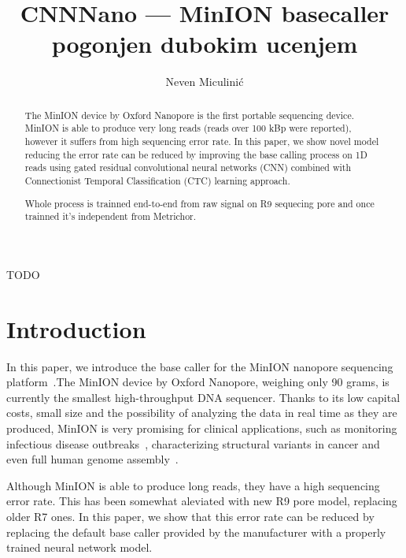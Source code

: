 \documentclass[times, utf8, seminar]{fer}
\begin{document}
\theoremstyle{definition}
\newtheorem{definition}{Definition}[section]

\title{CNNNano --- MinION  basecaller pogonjen dubokim ucenjem}
\author{Neven Miculinić}

\maketitle
\tableofcontents

\begin{sazetak}
TODO


\end{sazetak}

\begin{abstract}
    The MinION device by Oxford Nanopore is the first portable sequencing device. MinION is able to produce very long reads (reads over 100 kBp were reported), however it suffers from high sequencing error rate. In this paper, we show novel model reducing the error rate can be reduced by improving the base calling process on 1D reads using gated residual convolutional neural networks (CNN) combined with Connectionist Temporal Classification (CTC) learning approach.

    Whole process is trainned end-to-end from raw signal on R9 sequecing pore and once trainned it's independent from Metrichor.
\keywords{}
\end{abstract}

\chapter{Introduction}

In this paper, we introduce the base caller for the MinION nanopore sequencing platform~\cite{mikheyev2014first}.The MinION device by Oxford Nanopore, weighing only 90 grams, is currently the smallest high-throughput DNA sequencer. Thanks to its low capital costs, small size and the possibility of analyzing the data in real time as they are produced, MinION is very promising for clinical applications, such as monitoring infectious disease outbreaks~\cite{judge2015early}\cite{quick2016real}, characterizing structural variants in cancer\cite{norris2016nanopore} and even full human genome assembly~\cite{jain2017nanopore}.

Although MinION is able to produce long reads, they have a high sequencing error rate. This has been somewhat aleviated with new R9 pore model, replacing older R7 ones. In this paper, we show that this error rate can be reduced by replacing the default base caller provided by the manufacturer with a properly trained neural network model.
\end{document}
